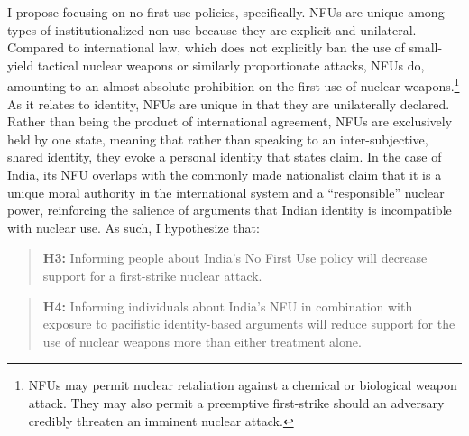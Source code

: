 \documentclass[12pt]{article}
\begin{document}
I propose focusing on no first use policies, specifically. NFUs are unique among types of institutionalized non-use because they are explicit and unilateral. Compared to international law, which does not explicitly ban the use of small-yield tactical nuclear weapons or similarly proportionate attacks, NFUs do, amounting to an almost absolute prohibition on the first-use of nuclear weapons.\footnote{ NFUs may permit nuclear retaliation against a chemical or biological weapon attack. They may also permit a preemptive first-strike should an adversary credibly threaten an imminent nuclear attack.} As it relates to identity, NFUs are unique in that they are unilaterally declared. Rather than being the product of international agreement, NFUs are exclusively held by one state, meaning that rather than speaking to an inter-subjective, shared identity, they evoke a personal identity that states claim. In the case of India, its NFU overlaps with the commonly made nationalist claim that it is a unique moral authority in the international system and a “responsible” nuclear power, reinforcing the salience of arguments that Indian identity is incompatible with nuclear use. As such, I hypothesize that:

\begin{quote}
\textbf{H3:} Informing people about India's No First Use policy will decrease support for a first-strike nuclear attack.
\end{quote}

\begin{quote}
\textbf{H4:} Informing individuals about India's NFU in combination with exposure to pacifistic identity-based arguments will reduce support for the use of nuclear weapons more than either treatment alone.
\end{quote}
\end{document}
